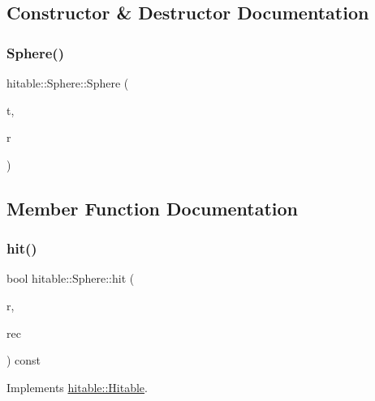 \subsection{Constructor \& Destructor Documentation}
\mbox{\label{classhitable_1_1Sphere_a1ebffcd034720ede81381297f5e2fe89}} 
\subsubsection{\texorpdfstring{Sphere()}{Sphere()}}
{\footnotesize\ttfamily hitable\+::\+Sphere\+::\+Sphere (\begin{DoxyParamCaption}\item[{const \mbox{\hyperlink{classtransform_1_1Transform}{transform\+::\+Transform}} \&}]{t,  }\item[{const \mbox{\hyperlink{cyclop_8hpp_a07afd7094cb489cbd514c76e6f55d34f}{Float}} \&}]{r }\end{DoxyParamCaption})}



\subsection{Member Function Documentation}
\mbox{\label{classhitable_1_1Sphere_ac8ff0fda7dc4914174c72ccc25728dba}} 
\subsubsection{\texorpdfstring{hit()}{hit()}}
{\footnotesize\ttfamily bool hitable\+::\+Sphere\+::hit (\begin{DoxyParamCaption}\item[{const \mbox{\hyperlink{classRay}{Ray}} \&}]{r,  }\item[{\mbox{\hyperlink{structhitable_1_1HitRecord}{Hit\+Record}} $\ast$}]{rec }\end{DoxyParamCaption}) const\hspace{0.3cm}{\ttfamily [virtual]}}



Implements \mbox{\hyperlink{classhitable_1_1Hitable_a6bc67aefe8669316b369e2034644bed0}{hitable\+::\+Hitable}}.

\mbox{\label{classhitable_1_1Sphere_a83c88a65d5f727af1b69e98c9ac71fa0}} 
